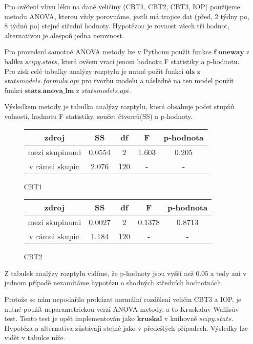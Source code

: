 \documentclass{article}
\begin{document}
Pro ověření vlivu léku na dané veličiny (CBT1, CBT2, CBT3, IOP) použijeme metodu ANOVA, kterou vždy porovnáme,
jestli má trojice dat (před, 2 týdny po, 8 týdnů po) stejné střední hodnoty.
Hypotézou je rovnost všech tří hodnot, alternativou je alespoň jedna nerovnost.

Pro provedení samotné ANOVA metody lze v Pythonu použít funkce $\mathbf{f\_oneway}$ z balíku $scipy.stats$, která ovšem vrací jenom
hodnotu F statistiky a p-hodnotu.
Pro zisk celé tabulky analýzy rozptylu je nutné požít funkci $\mathbf{ols}$ z $statsmodels.formula.api$ pro tvorbu modelu
a následně na ten model použít funkci $\mathbf{stats.anova\_lm}$ z $statsmodels.api$.

Výsledkem metody je tabulka analýzy rozptylu, která obsahuje počet stupňů volnosti, hodnotu F statistiky, součet čtverců(SS)
a p-hodnoty.

\begin{figure}[H]
  \centering
    \begin{tabular}{|ccccc|}
      \hline
      zdroj & SS & df & F & p-hodnota \\
      \hline
      mezi skupinami & 0.0554 & 2 & 1.603 & 0.205 \\
      v rámci skupin & 2.076 & 120 & - & - \\
      \hline
    \end{tabular}
    \caption{CBT1}
\end{figure}
    

\begin{figure}[H]
  \centering
    \begin{tabular}{|ccccc|}
      \hline
      zdroj & SS & df & F & p-hodnota \\
      \hline
      mezi skupinami & 0.0027 & 2 & 0.1378 & 0.8713 \\
      v rámci skupin & 1.184 & 120 & - & - \\
      \hline
    \end{tabular}
    \caption{CBT2}
\end{figure}

Z tabulek analýzy rozptylu vidíme, že p-hodnoty jsou vyšší než 0.05 a tedy ani v jednom případě nezamítáme hypotézu o shodných středních hodnotnách.

Protože se nám nepodařilo prokázat normální rozdělení veličin CBT3 a IOP, je nutné použít neparametrickou verzi ANOVA metody, a to Kruskalův-Wallisův test. 
Tento test je opět implementován jako $\mathbf{kruskal}$ v knihovně $scipy.stats$.
Hypotéza a alternativa zůstávají stejné jako v předešlých případech.
Výsledky lze vidět v tabulce níže.
\end{document}
